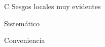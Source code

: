 \documentclass[
  11pt,
  ignorenonframetext,
]{beamer}
\begin{document}
\begin{frame}{C}
\protect\hypertarget{c-1}{}
Sesgos locales muy evidentes
\end{frame}

\begin{frame}{Sistemático}
\protect\hypertarget{sistemuxe1tico}{}
\end{frame}

\begin{frame}{Conveniencia}
\protect\hypertarget{conveniencia}{}
\end{frame}
\end{document}
